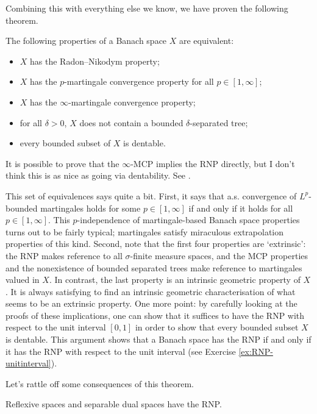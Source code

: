 Combining this with everything else we know, we have proven the following theorem.
\begin{thm}
  The following properties of a Banach space $X$ are equivalent:
  \begin{itemize}
  \item $X$ has the Radon--Nikodym property;
  \item $X$ has the $p$-martingale convergence property for all $p \in [1,\infty]$;
  \item $X$ has the $\infty$-martingale convergence property;
  \item for all $\delta > 0$, $X$ does not contain a bounded $\delta$-separated tree;
  \item every bounded subset of $X$ is dentable.
  \end{itemize}
\end{thm}

\begin{rmk}
  It is possible to prove that the $\infty$-MCP implies the RNP directly, but I don't think this is as nice as going via dentability.
  See \cite[Proof of Theorem 2.9]{gP16}.
\end{rmk}

This set of equivalences says quite a bit.
First, it says that a.s. convergence of $L^p$-bounded martingales holds for some $p \in [1,\infty]$ if and only if it holds for all $p \in [1,\infty]$.
This $p$-independence of martingale-based Banach space properties turns out to be fairly typical; martingales satisfy miraculous extrapolation properties of this kind.
Second, note that the first four properties are `extrinsic': the RNP makes reference to all $\sigma$-finite measure spaces, and the MCP properties and the nonexistence of bounded separated trees make reference to martingales valued in $X$.
In contrast, the last property is an intrinsic geometric property of $X$.
It is always satisfying to find an intrinsic geometric characterisation of what seems to be an extrinsic property.
One more point: by carefully looking at the proofs of these implications, one can show that it suffices to have the RNP with respect to the unit interval $[0,1]$ in order to show that every bounded subset $X$ is dentable.
This argument shows that a Banach space has the RNP if and only if it has the RNP with respect to the unit interval (see Exercise \ref{ex:RNP-unitinterval}).

Let's rattle off some consequences of this theorem.

\begin{cor}
  Reflexive spaces and separable dual spaces have the RNP.
\end{cor}

